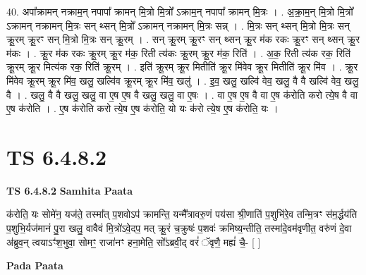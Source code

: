 \documentclass[17pt]{extarticle}
\begin{document}
40. अपा᳚क्रामन् नक्राम॒न् नपापा᳚ क्रामन् मि॒त्रो मि॒त्रो᳚ ऽक्राम॒न् नपापा᳚ क्रामन् मि॒त्रः । . अ॒क्रा॒म॒न् मि॒त्रो मि॒त्रो᳚ ऽक्रामन् नक्रामन् मि॒त्रः सन् थ्सन् मि॒त्रो᳚ ऽक्रामन् नक्रामन् मि॒त्रः सन्न् । . मि॒त्रः सन् थ्सन् मि॒त्रो मि॒त्रः सन् क्रू॒रम् क्रू॒रꣳ सन् मि॒त्रो मि॒त्रः सन् क्रू॒रम् । . सन् क्रू॒रम् क्रू॒रꣳ सन् थ्सन् क्रू॒र म॑क रकः क्रू॒रꣳ सन् थ्सन् क्रू॒र म॑कः । . क्रू॒र म॑क रकः क्रू॒रम् क्रू॒र म॑क॒ रिती त्य॑कः क्रू॒रम् क्रू॒र म॑क॒ रिति॑ । . अ॒क॒ रिती त्य॑क रक॒ रिति॑ क्रू॒रम् क्रू॒र मित्य॑क रक॒ रिति॑ क्रू॒रम् । . इति॑ क्रू॒रम् क्रू॒र मितीति॑ क्रू॒र मि॑वेव क्रू॒र मितीति॑ क्रू॒र मि॑व । . क्रू॒र मि॑वेव क्रू॒रम् क्रू॒र मि॑व॒ खलु॒ खल्वि॑व क्रू॒रम् क्रू॒र मि॑व॒ खलु॑ । . इ॒व॒ खलु॒ खल्वि॑ वेव॒ खलु॒ वै वै खल्वि॑ वेव॒ खलु॒ वै । . खलु॒ वै वै खलु॒ खलु॒ वा ए॒ष ए॒ष वै खलु॒ खलु॒ वा ए॒षः । . वा ए॒ष ए॒ष वै वा ए॒ष क॑रोति करो त्ये॒ष वै वा ए॒ष क॑रोति । . ए॒ष क॑रोति करो त्ये॒ष ए॒ष क॑रोति॒ यो यः क॑रो त्ये॒ष ए॒ष क॑रोति॒ यः । \newline
\pagebreak
{}

\section{ TS 6.4.8.2 }

\textbf{TS 6.4.8.2 } \newline
\textbf{Samhita Paata} \newline

क॑रोति॒ यः सोमे॑न॒ यज॑ते॒ तस्मा᳚त् प॒शवोऽप॑ क्रामन्ति॒ यन्मै᳚त्रावरु॒णं पय॑सा श्री॒णाति॑ प॒शुभि॑रे॒व तन्मि॒त्रꣳ स॑म॒र्द्धय॑ति प॒शुभि॒र्यज॑मानं पु॒रा खलु॒ वावैवं मि॒त्रो॑ऽवे॒दप॒ मत् क्रू॒रं च॒क्रुषः॑ प॒शवः॑ क्रमिष्य॒न्तीति॒ तस्मा॑दे॒वम॑वृणीत॒ वरु॑णं दे॒वा अ॑ब्रुव॒न् त्वयाऽꣳ॑श॒भुवा॒ सोमꣳ॒॒ राजा॑नꣳ हना॒मेति॒ सो᳚ऽब्रवी॒द् वरं॑ ॅवृणै॒ मह्यं॑ चै॒- [  ] \newline

\textbf{Pada Paata} \newline
\end{document}
